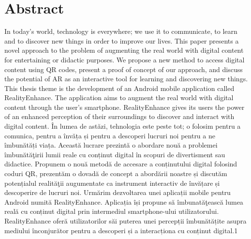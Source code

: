 \section*{Abstract}
In today's world, technology is everywhere; we use it to communicate, to learn and to discover new things in order to improve our lives.
This paper presents a novel approach to the problem of augmenting the real world with digital content for entertaining or didactic purposes. We propose a new method to access digital content using \ac{QR} codes, present a proof of concept of our approach, and discuss the potential of \ac{AR} as an interactive tool for learning and discovering new things.
This thesis theme is the development of an Android mobile application called RealityEnhance. The application aims to augment the real world with digital content through the user's smartphone. RealityEnhance gives its users the power of an enhanced perception of their surroundings to discover and interact with digital content.
\newline
\newline
În lumea de astăzi, tehnologia este peste tot; o folosim pentru a comunica, pentru a învăța și pentru a descoperi lucruri noi pentru a ne îmbunătăți viața.
Această lucrare prezintă o abordare nouă a problemei îmbunătăţirii lumii reale cu conținut digital în scopuri de divertisment sau didactice. Propunem o nouă metodă de accesare a conținutului digital folosind coduri \ac{QR}, prezentăm o dovadă de concept a abordării noastre și discutăm potențialul realităţii augumentate ca instrument interactiv de învățare și descoperire de lucruri noi.
Urmărim dezvoltarea unei aplicații mobile pentru Android numită RealityEnhance. Aplicația își propune să îmbunatăţească lumea reală cu conținut digital prin intermediul smartphone-ului utilizatorului. RealityEnhance oferă utilizatorilor săi puterea unei percepții îmbunătățite asupra mediului înconjurător pentru a descoperi și a interacționa cu conținut digital.1